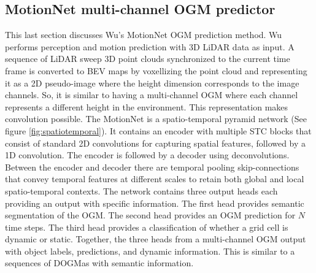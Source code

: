 \subsection{MotionNet multi-channel \gls{OGM} predictor} \label{subsec:motionnet}
This last section discusses Wu's \cite{wu2020motionnet} MotionNet \gls{OGM} prediction method. Wu \cite{wu2020motionnet} performs perception and motion prediction with 3D LiDAR data as input. A sequence of LiDAR sweep 3D point clouds synchronized to the current time frame is converted to \gls{BEV} maps by voxellizing the point cloud and representing it as a 2D pseudo-image where the height dimension corresponds to the image channels. So, it is similar to having a multi-channel \gls{OGM} where each channel represents a different height in the environment. This representation makes convolution possible. The MotionNet is a spatio-temporal pyramid network (See figure \ref{fig:spatiotemporal}). It contains an encoder with multiple \gls{STC} blocks that consist of standard 2D convolutions for capturing spatial features, followed by a 1D convolution. The encoder is followed by a decoder using deconvolutions. Between the encoder and decoder there are temporal pooling skip-connections that convey temporal features at different scales to retain both global and local spatio-temporal contexts. The network contains three output heads each providing an output with specific information. The first head provides semantic segmentation of the \gls{OGM}. The second head provides an \gls{OGM} prediction for $N$ time steps. The third head provides a classification of whether a grid cell is dynamic or static. Together, the three heads from a multi-channel \gls{OGM} output with object labels, predictions, and dynamic information. This is similar to a sequences of \glspl{DOGMa} with semantic information. \\


